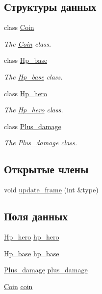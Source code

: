 \subsection*{Структуры данных}
\begin{DoxyCompactItemize}
\item 
class \hyperlink{classGameObject_1_1Runes_1_1Coin}{Coin}
\begin{DoxyCompactList}\small\item\em The \hyperlink{classGameObject_1_1Runes_1_1Coin}{Coin} class. \end{DoxyCompactList}\item 
class \hyperlink{classGameObject_1_1Runes_1_1Hp__base}{Hp\+\_\+base}
\begin{DoxyCompactList}\small\item\em The \hyperlink{classGameObject_1_1Runes_1_1Hp__base}{Hp\+\_\+base} class. \end{DoxyCompactList}\item 
class \hyperlink{classGameObject_1_1Runes_1_1Hp__hero}{Hp\+\_\+hero}
\begin{DoxyCompactList}\small\item\em The \hyperlink{classGameObject_1_1Runes_1_1Hp__hero}{Hp\+\_\+hero} class. \end{DoxyCompactList}\item 
class \hyperlink{classGameObject_1_1Runes_1_1Plus__damage}{Plus\+\_\+damage}
\begin{DoxyCompactList}\small\item\em The \hyperlink{classGameObject_1_1Runes_1_1Plus__damage}{Plus\+\_\+damage} class. \end{DoxyCompactList}\end{DoxyCompactItemize}
\subsection*{Открытые члены}
\begin{DoxyCompactItemize}
\item 
void \hyperlink{classGameObject_1_1Runes_a67bc85b74264e40b12f59b0c54e9c0db}{update\+\_\+frame} (int \&type)
\end{DoxyCompactItemize}
\subsection*{Поля данных}
\begin{DoxyCompactItemize}
\item 
\hyperlink{classGameObject_1_1Runes_1_1Hp__hero}{Hp\+\_\+hero} \hyperlink{classGameObject_1_1Runes_aa5a714bdf8756bf51223127bfe153ad7}{hp\+\_\+hero}
\item 
\hyperlink{classGameObject_1_1Runes_1_1Hp__base}{Hp\+\_\+base} \hyperlink{classGameObject_1_1Runes_a70b4206ddc0146c08a105c95291b26e9}{hp\+\_\+base}
\item 
\hyperlink{classGameObject_1_1Runes_1_1Plus__damage}{Plus\+\_\+damage} \hyperlink{classGameObject_1_1Runes_ab8155a9e9c17e969e26cb2cf05d8d7aa}{plus\+\_\+damage}
\item 
\hyperlink{classGameObject_1_1Runes_1_1Coin}{Coin} \hyperlink{classGameObject_1_1Runes_ae9001d326154583d3a43efb165d00296}{coin}
\end{DoxyCompactItemize}


